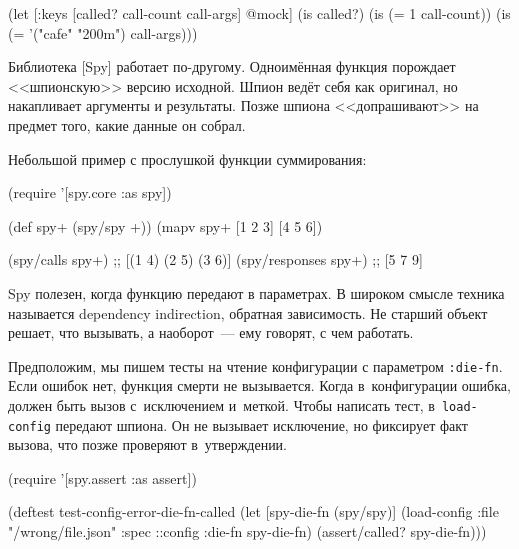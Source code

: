 \else

\begin{english}
  \begin{clojure}
(let [{:keys [called? call-count call-args]} @mock]
  (is called?)
  (is (= 1 call-count))
  (is (= '("cafe" "200m") call-args)))
  \end{clojure}
\end{english}

\fi


Библиотека [Spy]
работает по-другому. Одноимённая функция порождает <<шпионскую>> версию
исходной. Шпион ведёт себя как оригинал, но накапливает аргументы и
результаты. Позже шпиона <<допрашивают>> на предмет того, какие данные он
собрал.

Небольшой пример с прослушкой функции суммирования:

\begin{english}
  \begin{clojure}
(require '[spy.core :as spy])

(def spy+ (spy/spy +))
(mapv spy+ [1 2 3] [4 5 6])

(spy/calls spy+)
;; [(1 4) (2 5) (3 6)]
(spy/responses spy+)
;; [5 7 9]
  \end{clojure}
\end{english}



Spy полезен, когда функцию передают в параметрах. В широком смысле техника
называется dependency indirection, обратная зависимость. Не старший объект
решает, что вызывать, а наоборот~--- ему говорят, с чем работать.

Предположим, мы пишем тесты на чтение конфигурации с параметром
\verb|:die-fn|. Если ошибок нет, функция смерти не вызывается. Когда
в~конфигурации ошибка, должен быть вызов с~исключением и~меткой. Чтобы написать
тест, в~\verb|load-config| передают шпиона. Он не вызывает исключение, но
фиксирует факт вызова, что позже проверяют в~утверждении.

\pagebreakafive

\begin{english}
  \begin{clojure}
(require '[spy.assert :as assert])

(deftest test-config-error-die-fn-called
  (let [spy-die-fn (spy/spy)]
    (load-config {:file "/wrong/file.json"
                  :spec ::config
                  :die-fn spy-die-fn})
    (assert/called? spy-die-fn)))
  \end{clojure}
\end{english}

